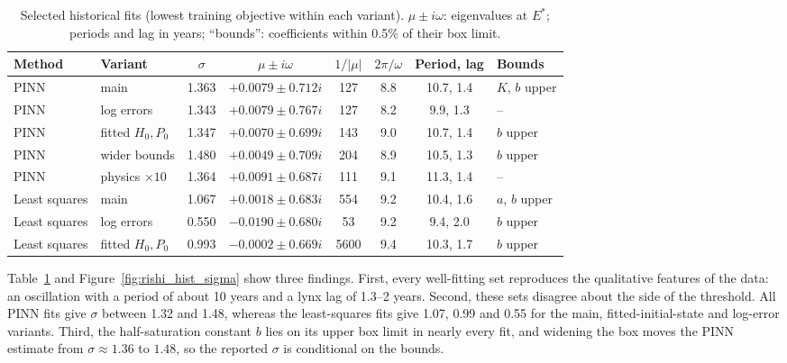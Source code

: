 \begin{table}[htbp]
  \centering
  \caption{Selected historical fits (lowest training objective within each variant).
  $\mu\pm i\omega$: eigenvalues at $E^*$; periods and lag in years; ``bounds'': coefficients
  within 0.5\% of their box limit.}
  \label{tab:rishi_hist}
  \small
  \begin{tabular}{llcccccl}
    \toprule
    Method & Variant & $\sigma$ & $\mu\pm i\omega$ & $1/|\mu|$ & $2\pi/\omega$ & Period, lag & Bounds \\
    \midrule
    PINN & main            & 1.363 & $+0.0079\pm0.712i$ & 127  & 8.8 & 10.7, 1.4 & $K$, $b$ upper \\
    PINN & log errors      & 1.343 & $+0.0079\pm0.767i$ & 127  & 8.2 & 9.9, 1.3  & -- \\
    PINN & fitted $H_0,P_0$& 1.347 & $+0.0070\pm0.699i$ & 143  & 9.0 & 10.7, 1.4 & $b$ upper \\
    PINN & wider bounds    & 1.480 & $+0.0049\pm0.709i$ & 204  & 8.9 & 10.5, 1.3 & $b$ upper \\
    PINN & physics $\times10$ & 1.364 & $+0.0091\pm0.687i$ & 111 & 9.1 & 11.3, 1.4 & -- \\
    Least squares & main   & 1.067 & $+0.0018\pm0.683i$ & 554  & 9.2 & 10.4, 1.6 & $a$, $b$ upper \\
    Least squares & log errors & 0.550 & $-0.0190\pm0.680i$ & 53 & 9.2 & 9.4, 2.0 & $b$ upper \\
    Least squares & fitted $H_0,P_0$ & 0.993 & $-0.0002\pm0.669i$ & 5600 & 9.4 & 10.3, 1.7 & $b$ upper \\
    \bottomrule
  \end{tabular}
\end{table}

Table~\ref{tab:rishi_hist} and Figure~\ref{fig:rishi_hist_sigma} show three findings.
First, every well-fitting set reproduces the qualitative features of the data: an oscillation
with a period of about 10 years and a lynx lag of 1.3--2 years. Second, these sets disagree about
the side of the threshold. All PINN fits give $\sigma$ between 1.32 and 1.48, whereas the
least-squares fits give 1.07, 0.99 and 0.55 for the main, fitted-initial-state and log-error
variants. Third, the half-saturation constant $b$ lies on its upper box limit in nearly every
fit, and widening the box moves the PINN estimate from $\sigma\approx1.36$ to $1.48$, so the
reported $\sigma$ is conditional on the bounds.

